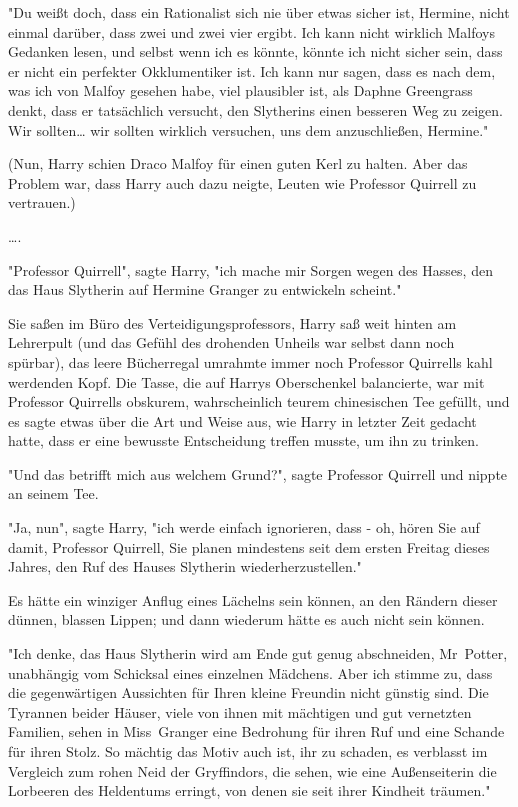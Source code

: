 {"Du weißt doch, dass ein Rationalist sich nie über etwas sicher ist, Hermine, nicht einmal darüber, dass zwei und zwei vier ergibt. Ich kann nicht wirklich Malfoys Gedanken lesen, und selbst wenn ich es könnte, könnte ich nicht sicher sein, dass er nicht ein perfekter Okklumentiker ist. Ich kann nur sagen, dass es nach dem, was ich von Malfoy gesehen habe, viel plausibler ist, als Daphne Greengrass denkt, dass er tatsächlich versucht, den Slytherins einen besseren Weg zu zeigen. Wir sollten… wir sollten wirklich versuchen, uns dem anzuschließen, Hermine."

(Nun, Harry schien Draco Malfoy für einen guten Kerl zu halten. Aber das Problem war, dass Harry auch dazu neigte, Leuten wie Professor Quirrell zu vertrauen.)

….

"Professor Quirrell", sagte Harry, "ich mache mir Sorgen wegen des Hasses, den das Haus Slytherin auf Hermine Granger zu entwickeln scheint."

Sie saßen im Büro des Verteidigungsprofessors, Harry saß weit hinten am Lehrerpult (und das Gefühl des drohenden Unheils war selbst dann noch spürbar), das leere Bücherregal umrahmte immer noch Professor Quirrells kahl werdenden Kopf. Die Tasse, die auf Harrys Oberschenkel balancierte, war mit Professor Quirrells obskurem, wahrscheinlich teurem chinesischen Tee gefüllt, und es sagte etwas über die Art und Weise aus, wie Harry in letzter Zeit gedacht hatte, dass er eine bewusste Entscheidung treffen musste, um ihn zu trinken.

"Und das betrifft mich aus welchem Grund?", sagte Professor Quirrell und nippte an seinem Tee.

"Ja, nun", sagte Harry, "ich werde einfach ignorieren, dass - oh, hören Sie auf damit, Professor Quirrell, Sie planen mindestens seit dem ersten Freitag dieses Jahres, den Ruf des Hauses Slytherin wiederherzustellen."

Es hätte ein winziger Anflug eines Lächelns sein können, an den Rändern dieser dünnen, blassen Lippen; und dann wiederum hätte es auch nicht sein können.

"Ich denke, das Haus Slytherin wird am Ende gut genug abschneiden, Mr~Potter, unabhängig vom Schicksal eines einzelnen Mädchens. Aber ich stimme zu, dass die gegenwärtigen Aussichten für Ihren kleine Freundin nicht günstig sind. Die Tyrannen beider Häuser, viele von ihnen mit mächtigen und gut vernetzten Familien, sehen in Miss~Granger eine Bedrohung für ihren Ruf und eine Schande für ihren Stolz. So mächtig das Motiv auch ist, ihr zu schaden, es verblasst im Vergleich zum rohen Neid der Gryffindors, die sehen, wie eine Außenseiterin die Lorbeeren des Heldentums erringt, von denen sie seit ihrer Kindheit träumen."

}
